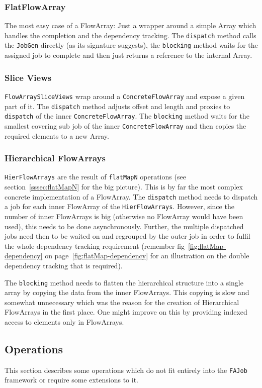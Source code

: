 \documentclass[runningheads,a4paper,fleqn]{llncs}
\begin{document}
\subsubsection{FlatFlowArray}
The most easy case of a FlowArray: Just a wrapper around a simple
Array which handles the completion and the dependency tracking. The
\texttt{dispatch} method calls the \texttt{JobGen} directly (as its
signature suggests), the \texttt{blocking} method waits for the
assigned job to complete and then just returns a reference to the
internal Array.

\subsubsection{Slice Views}
\texttt{FlowArraySliceViews} wrap around a \texttt{ConcreteFlowArray}
and expose a given part of it. The \texttt{dispatch} method adjusts 
offset and length and proxies to \texttt{dispatch} of the inner
\texttt{ConcreteFlowArray}. The \texttt{blocking} method waits for the
smallest covering sub job of the inner \texttt{ConcreteFlowArray} and
then copies the required elements to a new Array.

\subsubsection{Hierarchical FlowArrays}
\texttt{HierFlowArrays} are the result of \texttt{flatMapN} operations
(see section~\ref{sssec:flatMapN} for the big picture). This is by far
the most complex concrete implementation of a FlowArray. The
\texttt{dispatch} method needs to dispatch a job for each inner
FlowArray of the \texttt{HierFlowArrays}. However, since the number of
inner FlowArrays is big (otherwise no FlowArray would have been used),
this needs to be done asynchronously. Further, the multiple dispatched
jobs need then to be waited on and regrouped by the outer job in order
to fulfil the whole dependency tracking requirement (remember
fig~\ref{fig:flatMap-dependency} on
page~\ref{fig:flatMap-dependency} for an illustration on the
double dependency tracking that is required).

The \texttt{blocking} method needs to flatten the hierarchical
structure into a single array by copying the data from the inner
FlowArrays. This copying is slow and somewhat unnecessary which 
was the reason for the creation of Hierarchical FlowArrays in the
first place. One might improve on this by providing indexed access to
elements only in FlowArrays.

\subsection{Operations}
\label{ssec:imp-operations}
This section describes some operations which do not fit entirely into
the \texttt{FAJob} framework or require some extensions to it.
\end{document}
